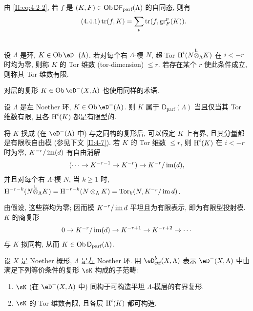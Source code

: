 由 \eqref{II:eq:4-2-2}, 若 $f$ 是 $(K,F)\in\operatorname{Ob}\mathsf{DF}_\text{parf}(\Lambda)$ 的自同态, 则有
\begin{equation*}\tag{4.4.1}\label{II:eq:4-4-1}
 \operatorname{tr}(f,K) = \sum_p \operatorname{tr}(f,\operatorname{gr}_F^p(K)) \text{.}
\end{equation*}

\subsection{}\label{II:4-5}

设 $\Lambda$ 是环, $K\in\ob\eD^-(\Lambda)$. 若对每个右 $\Lambda$-模 $N$, 超 Tor $\operatorname{H}^i(N{\overset{\mathsf{L}}{\otimes}}_\Lambda K)$ 在 $i<-r$ 时均为零, 则称 $K$ 的 Tor 维数 (tor-dimension) $\leqslant r$. 若存在某个 $r$ 使此条件成立, 则称其 Tor 维数有限.

对层的复形 $K\in\ob\eD^-(X,\Lambda)$ 也使用同样的术语.

\begin{lemma}\label{II:4-5-1}
设 $\Lambda$ 是左 Noether 环, $K\in\ob\eD^-(\Lambda)$. 则 $K$ 属于 $\mathsf{D}_\text{parf}(\Lambda)$ 当且仅当其 Tor 维数有限, 且各 $\operatorname{H}^i(K)$ 都是有限型的.
\end{lemma}

将 $K$ 换成 (在 $\eD^-(\Lambda)$ 中) 与之同构的复形后, 可以假定 $K$ 上有界, 且其分量都是有限秩自由模 (参见下文 \ref{II:4-7}). 若 $K$ 的 Tor 维数 $\leqslant r$, 则 $\operatorname{H}^i(K)$ 在 $i<-r$ 时为零, $K^{-r}/\operatorname{im}(d)$ 有自由消解
\[
  (\cdots \to K^{-r-1} \to K^{-r}) \to K^{-r}/\operatorname{im}(d) \text{,}
\]
并且对每个右 $\Lambda$-模 $N$, 当 $k\geqslant 1$ 时,
$\operatorname{H}^{-r-k}(N{\overset{\mathsf{L}}{\otimes}}_\Lambda K) = \operatorname{H}^{-r-k}(N\otimes_\Lambda K)
= \operatorname{Tor}_k(N,K^{-r}/\operatorname{im} d)$.

由假设, 这些群均为零; 因而模 $K^{-r}/\operatorname{im} d$ 平坦且为有限表示, 即为有限型投射模. $K$ 的商复形
\[
  0 \to K^{-r}/\operatorname{im}(d) \to K^{-r+1} \to K^{-r+2}\to \cdots
\]
与 $K$ 拟同构, 从而 $K\in\operatorname{Ob}\mathsf{D}_\text{parf}(\Lambda)$.

\begin{prop-def_}\label{II:4-6}
设 $X$ 是 Noether 概形, $\Lambda$ 是左 Noether 环. 用 $\eD_\textnormal{ctf}^b(X,\Lambda)$ 表示 $\eD^-(X,\Lambda)$ 中由满足下列等价条件的复形 $\sK$ 构成的子范畴:
\begin{enumerate}[\indent i)]
  \item $\sK$ (在 $\eD^-(X,\Lambda)$ 中) 同构于可构造平坦 $\Lambda$-模层的有界复形.
  \item $\sK$ 的 Tor 维数有限, 且各层 $\operatorname{H}^i(K)$ 都可构造.
\end{enumerate}
\end{prop-def_}

